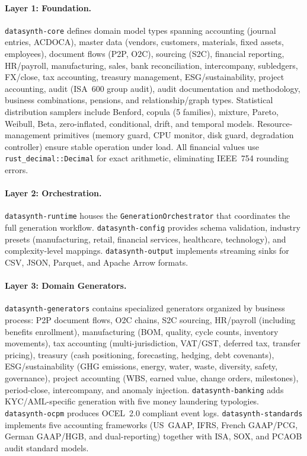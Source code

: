 \paragraph{Layer 1: Foundation.}
\texttt{datasynth-core} defines domain model types spanning
accounting (journal entries, ACDOCA), master data (vendors, customers,
materials, fixed assets, employees), document flows (P2P, O2C),
sourcing (S2C), financial reporting, HR/payroll, manufacturing, sales,
bank reconciliation, intercompany, subledgers, FX/close,
tax accounting, treasury management, ESG/sustainability, project
accounting, audit (ISA~600 group audit), audit documentation and
methodology, business combinations, pensions, and relationship/graph
types.  Statistical distribution samplers include Benford, copula
(5 families), mixture, Pareto, Weibull, Beta, zero-inflated,
conditional, drift, and temporal models.  Resource-management primitives
(memory guard, CPU monitor, disk guard, degradation controller) ensure
stable operation under load.  All financial values use
\texttt{rust\_decimal::Decimal} for exact arithmetic, eliminating
IEEE~754 rounding errors.

\paragraph{Layer 2: Orchestration.}
\texttt{datasynth-runtime} houses the \texttt{GenerationOrchestrator}
that coordinates the full generation workflow.
\texttt{datasynth-config} provides schema validation, industry presets
(manufacturing, retail, financial services, healthcare, technology), and
complexity-level mappings.
\texttt{datasynth-output} implements streaming sinks for CSV, JSON,
Parquet, and Apache Arrow formats.

\paragraph{Layer 3: Domain Generators.}
\texttt{datasynth-generators} contains specialized generators
organized by business process: P2P document flows, O2C chains, S2C
sourcing, HR/payroll (including benefits enrollment), manufacturing
(BOM, quality, cycle counts, inventory movements), tax accounting
(multi-jurisdiction, VAT/GST, deferred tax, transfer pricing),
treasury (cash positioning, forecasting, hedging, debt covenants),
ESG/sustainability (GHG emissions, energy, water, waste, diversity,
safety, governance), project accounting (WBS, earned value, change
orders, milestones), period-close, intercompany, and anomaly injection.
\texttt{datasynth-banking} adds KYC/AML-specific generation with five
money laundering typologies.
\texttt{datasynth-ocpm} produces OCEL~2.0 compliant event logs.
\texttt{datasynth-standards} implements five accounting frameworks
(US~GAAP, IFRS, French GAAP/PCG, German GAAP/HGB, and dual-reporting)
together with ISA, SOX, and PCAOB audit standard models.

